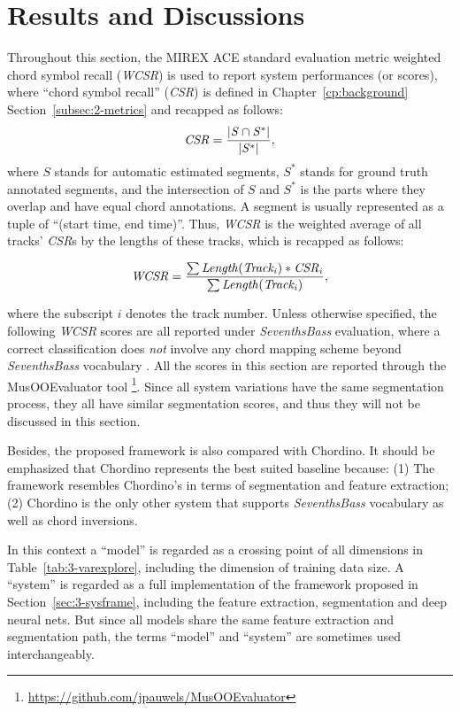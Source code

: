 \section{Results and Discussions} \label{sec:3-res}

Throughout this section, the MIREX ACE standard evaluation metric weighted chord symbol recall (\textit{WCSR}) is used to report system performances (or scores), where ``chord symbol recall'' (\textit{CSR}) is defined in Chapter~\ref{cp:background} Section~\ref{subsec:2-metrics} and recapped as follows:
\begin{equation}
	\mathit{CSR = {|S\cap S^*|\over|S^*|},}
	\label{eq:3-csr}
\end{equation}
where $S$ stands for automatic estimated segments, $S^*$ stands for ground truth annotated segments, and the intersection of $S$ and $S^*$ is the parts where they overlap and have equal chord annotations. A segment is usually represented as a tuple of ``(start time, end time)''. Thus, \textit{WCSR} is the weighted average of all tracks' \textit{CSR}s by the lengths of these tracks, which is recapped as follows:

\begin{equation}
	\mathit{WCSR = {\sum{Length(Track_i)*CSR_i} \over \sum{Length(Track_i)}}},
	\label{eq:3-wcsr}
\end{equation}

where the subscript $i$ denotes the track number. Unless otherwise specified, the following \textit{WCSR} scores are all reported under \textit{SeventhsBass} evaluation, where a correct classification does {\it not} involve any chord mapping scheme beyond \textit{SeventhsBass} vocabulary \cite{pauwels2013evaluating}. All the scores in this section are reported through the MusOOEvaluator tool \footnote{\url{https://github.com/jpauwels/MusOOEvaluator}}. Since all system variations have the same segmentation process, they all have similar segmentation scores, and thus they will not be discussed in this section.

Besides, the proposed framework is also compared with Chordino. It should be emphasized that Chordino represents the best suited baseline because: (1) The framework resembles Chordino's in terms of segmentation and feature extraction; (2) Chordino is the only other system that supports \textit{SeventhsBass} vocabulary as well as chord inversions.

In this context a ``model'' is regarded as a crossing point of all dimensions in Table~\ref{tab:3-varexplore}, including the dimension of training data size. A ``system'' is regarded as a full implementation of the framework proposed in Section~\ref{sec:3-sysframe}, including the feature extraction, segmentation and deep neural nets. But since all models share the same feature extraction and segmentation path, the terms ``model'' and ``system'' are sometimes used interchangeably.

